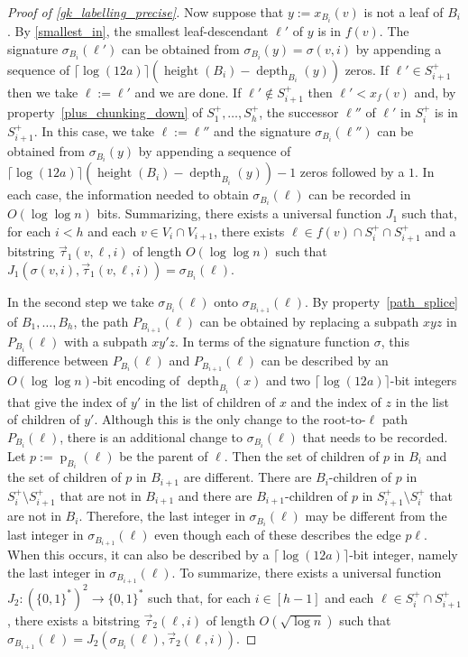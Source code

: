 \documentclass{patmorin}
\DeclareMathOperator{\height}{height}
\DeclareMathOperator{\depth}{depth}
\DeclareMathOperator{\parent}{p}
\newcommand{\Oh}{O}
\begin{document}
\begin{proof}[Proof of \cref{gk_labelling_precise}]
  Now suppose that $y:=x_{B_i}(v)$ is not a leaf of $B_i$. By \ref{smallest_in}, the smallest leaf-descendant $\ell'$ of $y$ is in $f(v)$.   The signature $\sigma_{B_i}(\ell')$ can be obtained from $\sigma_{B_i}(y)=\sigma(v,i)$ by appending a sequence of $\lceil\log(12a)\rceil(\height(B_i)-\depth_{B_i}(y))$ zeros. If $\ell'\in S^+_{i+1}$ then we take $\ell:=\ell'$ and we are done.  If $\ell'\not\in S^+_{i+1}$ then $\ell'<x_f(v)$ and, by property~\ref{plus_chunking_down} of $S^+_1,\ldots,S^+_h$, the successor $\ell''$ of $\ell'$ in $S^+_i$ is in $S^+_{i+1}$.  In this case, we take $\ell:=\ell''$ and the signature $\sigma_{B_i}(\ell'')$ can be obtained from $\sigma_{B_i}(y)$ by appending a sequence of $\lceil\log(12a)\rceil(\height(B_i)-\depth_{B_i}(y))-1$ zeros followed by a $1$.  In each case, the information needed to obtain $\sigma_{B_i}(\ell)$ can be recorded in $\Oh(\log{\log n})$ bits.  Summarizing, there exists a universal function $J_1$ such that, for each $i< h$ and each $v\in V_i\cap V_{i+1}$, there exists $\ell\in f(v)\cap S^+_i\cap S^+_{i+1}$ and a bitstring $\overrightarrow{\tau}_1(v,\ell,i)$ of length $\Oh(\log{\log n})$ such that $J_1(\sigma(v,i),\overrightarrow{\tau}_1(v,\ell,i))=\sigma_{B_i}(\ell)$.

  In the second step we take $\sigma_{B_i}(\ell)$ onto $\sigma_{B_{i+1}}(\ell)$.  By property~\ref{path_splice} of $B_1,\ldots,B_h$, the path $P_{B_{i+1}}(\ell)$ can be obtained by replacing a subpath $xyz$ in $P_{B_{i}}(\ell)$ with a subpath $xy'z$.  In terms of the signature function $\sigma$, this difference between $P_{B_i}(\ell)$ and $P_{B_{i+1}}(\ell)$ can be described by an $O(\log\log n)$-bit encoding of $\depth_{B_i}(x)$ and two $\lceil\log (12a)\rceil$-bit integers that give the index of $y'$ in the list of children of $x$ and the index of $z$ in the list of children of $y'$.  Although this is the only change to the root-to-$\ell$ path $P_{B_i}(\ell)$, there is an additional change to $\sigma_{B_i}(\ell)$ that needs to be recorded.  Let $p:=\parent_{B_i}(\ell)$ be the parent of $\ell$.  Then the set of children of $p$ in $B_i$ and the set of children of $p$ in $B_{i+1}$ are different.  There are $B_i$-children of $p$ in $S^+_{i}\setminus S^+_{i+1}$ that are not in $B_{i+1}$ and there are $B_{i+1}$-children of $p$ in $S^+_{i+1}\setminus S^+_i$ that are not in $B_i$.  Therefore, the last integer in $\sigma_{B_i}(\ell)$ may be different from the last integer in $\sigma_{B_{i+1}}(\ell)$ even though each of these describes the edge $p\ell$. When this occurs, it can also be described by a $\lceil \log(12a)\rceil$-bit integer, namely the last integer in $\sigma_{B_{i+1}}(\ell)$.  To summarize, there exists a universal function $J_2:(\{0,1\}^*)^2\to \{0,1\}^*$ such that, for each $i\in[h-1]$ and each $\ell\in S^+_{i}\cap S^+_{i+1}$, there exists a bitstring $\overrightarrow{\tau}_2(\ell,i)$ of length $\Oh(\sqrt{\log n})$ such that $\sigma_{B_{i+1}}(\ell)=J_2(\sigma_{B_i}(\ell),\overrightarrow{\tau}_2(\ell,i))$.  


\end{proof}
\end{document}
